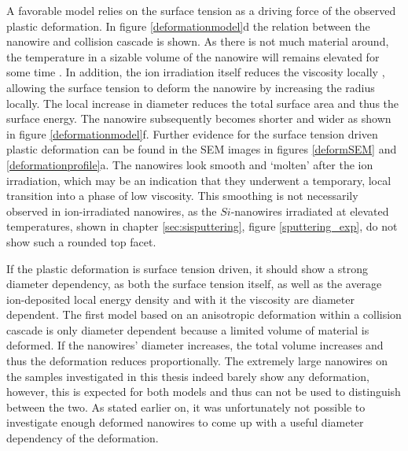 A favorable model relies on the surface tension as a driving force of the observed plastic deformation. In figure \ref{deformationmodel}d the relation between the nanowire and collision cascade is shown. As there is not much material around, the temperature in a sizable volume of the nanowire will remains elevated for some time \cite{borschel_ion-solid_2012,greaves_enhanced_2013,anders_sputtering_2015,johannes_ion_2015}. In addition, the ion irradiation itself reduces the viscosity locally \cite{snoeks_stress_1997,hu_burrowing_2002,mayr_mechanisms_2003}, allowing the surface tension to deform the nanowire by increasing the radius locally. The local increase in diameter reduces the total surface area and thus the surface energy. The nanowire subsequently becomes shorter and wider as shown in figure \ref{deformationmodel}f. Further evidence for the surface tension driven plastic deformation can be found in the SEM images in figures \ref{deformSEM} and \ref{deformationprofile}a. The nanowires look smooth and `molten' after the ion irradiation, which may be an indication that they underwent a temporary, local transition into a phase of low viscosity. This smoothing is not necessarily observed in ion-irradiated nanowires, as the $Si$-nanowires irradiated at elevated temperatures, shown in chapter \ref{sec:sisputtering}, figure \ref{sputtering_exp}, do not show such a rounded top facet.

If the plastic deformation is surface tension driven, it should show a strong diameter dependency, as both the surface tension itself, as well as the average ion-deposited local energy density and with it the viscosity are diameter dependent. The first model based on an anisotropic deformation within a collision cascade is only diameter dependent because a limited volume of material is  deformed. If the nanowires' diameter increases, the total volume increases and thus the deformation reduces proportionally. The extremely large nanowires on the samples investigated in this thesis indeed barely show any deformation, however, this is expected for both models and thus can not be used to distinguish between the two. As stated earlier on, it was unfortunately not possible to investigate enough deformed nanowires to come up with a useful diameter dependency of the deformation.

